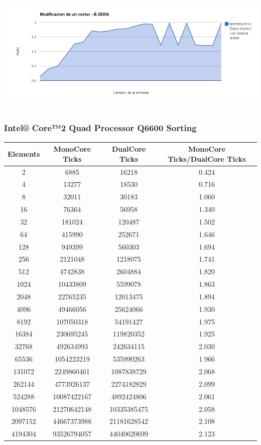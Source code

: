 	\begin{center}
	    \includegraphics[height=6cm]{images/i5_vector_sum.png}
	\end{center}

\subsubsection{Intel® Core™2 Quad Processor Q6600 Sorting}
\begin{center}
\begin{tabular}{|c|c|c|c|}
	\hline	
		Elements & MonoCore Ticks & DualCore Ticks & MonoCore Ticks/DualCore Ticks\\
	\hline
		2 & 6885 & 16218 & 0.424\\
	\hline
		4 & 13277 & 18530 & 0.716\\
	\hline
		8 & 32011 & 30183 & 1.060\\
	\hline
		16 & 76364 & 56958 & 1.340\\
	\hline
		32 & 181024 & 120487 & 1.502\\
	\hline
		64 & 415990 & 252671 & 1.646\\
	\hline
		128 & 949399 & 560303 & 1.694\\
	\hline
		256 & 2121048 & 1218075 & 1.741\\
	\hline
		512 & 4742838 & 2604884 & 1.820\\
	\hline
		1024 & 10433809 & 5599078 & 1.863\\
	\hline
		2048 & 22765235 & 12013475 & 1.894\\
	\hline
		4096 & 49466056 & 25624066 & 1.930\\
	\hline
		8192 & 107050318 & 54191427 & 1.975\\
	\hline
		16384 & 230695245 & 119820352 & 1.925\\
	\hline
		32768 & 492634993 & 242634115 & 2.030\\
	\hline
		65536 & 1054223219 & 535990263 & 1.966\\
	\hline
		131072 & 2249860461 & 1087838729 & 2.068\\
	\hline
		262144 & 4773926137 & 2274182829 & 2.099\\
	\hline
		524288 & 10087422167 & 4892424806 & 2.061\\
	\hline
		1048576 & 21270642148 & 10335385475 & 2.058\\
	\hline
		2097152 & 44667373988 & 21181628542 & 2.108\\
	\hline
		4194304 & 93526794057 & 44040620699 & 2.123\\
	\hline
\end{tabular}
\end{center}

